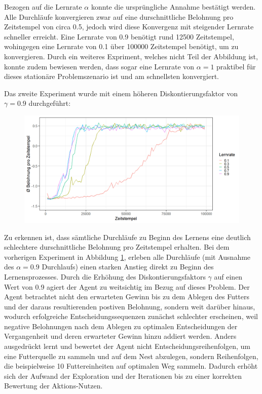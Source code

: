 Bezogen auf die Lernrate $\alpha$ konnte die ursprüngliche Annahme bestätigt werden. Alle Durchläufe konvergieren zwar auf eine durschnittliche Belohnung pro Zeitstempel von circa 0.5, jedoch wird diese Konvergenz mit steigender Lernrate schneller erreicht. Eine Lernrate von 0.9 benötigt rund 12500 Zeitstempel, wohingegen eine Lernrate von 0.1 über 100000 Zeitstempel benötigt, um zu konvergieren. Durch ein weiteres Expriment, welches nicht Teil der Abbildung ist, konnte zudem bewiesen werden, dass sogar eine Lernrate von $\alpha = 1$ praktibel für dieses stationäre Problemszenario ist und am schnellsten konvergiert.
\par 
Das zweite Experiment wurde mit einem höheren Diskontierungsfaktor von $\gamma=0.9$ durchgeführt:
\begin{figure}[H]
    \centering
    \includegraphics[width=\textwidth]{images/antGameAnalysis09DiscA}
    \label{fig:gamma09}
\end{figure}
Zu erkennen ist, dass sämtliche Durchläufe zu Beginn des Lernens eine deutlich schlechtere durschnittliche Belohnung pro Zeitstempel erhalten. Bei dem vorherigen Experiment in Abbildung \ref{fig:gamma09}, erleben alle Durchläufe (mit Ausnahme des $\alpha = 0.9$ Durchlaufs) einen starken Anstieg direkt zu Beginn des Lernensprozesses. Durch die Erhöhung des Diskontierungsfaktors $\gamma$ auf einen Wert von 0.9 agiert der Agent zu weitsichtig im Bezug auf dieses Problem. Der Agent betrachtet nicht den erwarteten Gewinn bis zu dem Ablegen des Futters und der daraus resultierenden postiven Belohnung, sondern weit darüber hinaus, wodurch erfolgreiche Entscheidungssequenzen zunächst schlechter erscheinen, weil negative Belohnungen nach dem Ablegen zu optimalen Entscheidungen der Vergangenheit und deren erwarteter Gewinn hinzu addiert werden. Anders ausgedrückt lernt und bewertet der Agent nicht Entscheidungsreihenfolgen, um eine Futterquelle zu sammeln und auf dem Nest abzulegen, sondern Reihenfolgen, die beispielweise 10 Futtereinheiten auf optimalen Weg sammeln. Dadurch erhöht sich der Aufwand der Exploration und der Iterationen bis zu einer korrekten Bewertung der Aktions-Nutzen.
